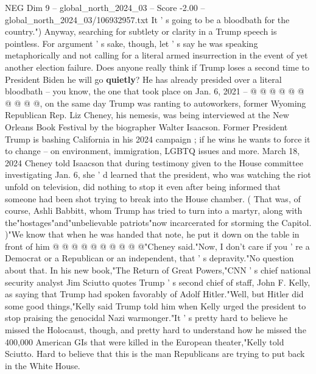\begin{textsample}{NEG Dim 9 – global\_north\_2024\_03 – Score -2.00 – global\_north\_2024\_03/106932957.txt}
It ' s going to be a bloodbath for the country.") Anyway, searching for subtlety or clarity in a Trump speech is pointless.
For argument ' s sake, though, let ' s say he was speaking metaphorically and not calling for a literal armed insurrection in the event of yet another election failure.
Does anyone really think if Trump loses a second time to President Biden he will go \textbf{quietly}?
He has already presided over a literal bloodbath -- you know, the one that took place on Jan. 6, 2021 -- @ @ @ @ @ @ @ @ @ @, on the same day Trump was ranting to autoworkers, former Wyoming Republican Rep.
Liz Cheney, his nemesis, was being interviewed at the New Orleans Book Festival by the biographer Walter Isaacson.
Former President Trump is bashing California in his 2024 campaign ; if he wins he wants to force it to change -- on environment, immigration, LGBTQ issues and more.
March 18, 2024 Cheney told Isaacson that during testimony given to the House committee investigating Jan. 6, she ' d learned that the president, who was watching the riot unfold on television, did nothing to stop it even after being informed that someone had been shot trying to break into the House chamber. ( That was, of course, Ashli Babbitt, whom Trump has tried to turn into a martyr, along with the"hostages"and"unbelievable patriots"now incarcerated for storming the Capitol. )"We know that when he was handed that note, he put it down on the table in front of him @ @ @ @ @ @ @ @ @ @"Cheney said."Now, I don't care if you ' re a Democrat or a Republican or an independent, that ' s depravity."No question about that.
In his new book,"The Return of Great Powers,"CNN ' s chief national security analyst Jim Sciutto quotes Trump ' s second chief of staff, John F.
Kelly, as saying that Trump had spoken favorably of Adolf Hitler."Well, but Hitler did some good things,"Kelly said Trump told him when Kelly urged the president to stop praising the genocidal Nazi warmonger."It ' s pretty hard to believe he missed the Holocaust, though, and pretty hard to understand how he missed the 400,000 American GIs that were killed in the European theater,"Kelly told Sciutto.
Hard to believe that this is the man Republicans are trying to put back in the White House.

\end{textsample}
